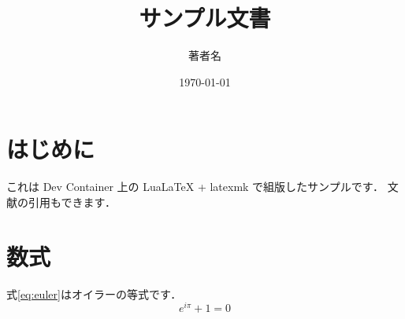\documentclass[a4paper,11pt]{ltjsarticle}
\title{サンプル文書}
\author{著者名}
\date{\today}
\begin{document}
\maketitle

\section{はじめに}
これは Dev Container 上の LuaLaTeX + latexmk で組版したサンプルです．
文献の引用もできます\cite{knuth1984}．

\section{数式}
式\eqref{eq:euler}はオイラーの等式です．
\begin{equation}
  e^{i\pi} + 1 = 0 \label{eq:euler}
\end{equation}

\printbibliography
\end{document}
